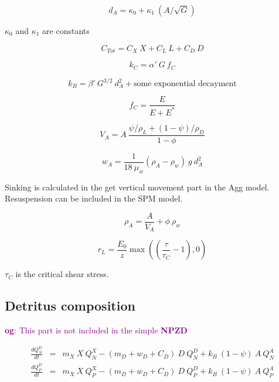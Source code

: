 \documentclass[fleqn]{article}                     %
\newcommand{\comment}[3][darkmagenta]{\textcolor{#1}{\textbf{#2}: #3}}
\begin{document}
\begin{equation}
  d_A = \kappa_0 + \kappa_1\ (A/\sqrt{G})
\end{equation}

$\kappa_0$ and $\kappa_1$ are constants

\begin{equation}
  C_{Tot} = C_X\ X + C_L\ L + C_D\ D
\end{equation}

\begin{equation}
  k_C = \alpha'\ G \ f_C
\end{equation}

\begin{equation}
  k_B = \beta'\ G^{3/2}\ d_A^2 + \textrm{some exponential decayment}
\end{equation}

\begin{equation}
  f_C = \frac{E}{E+E^*}
\end{equation}

\begin{equation}
  V_A = A\  \frac{\psi/ \rho_L + (1-\psi)/ \rho_D}{1-\phi}
\end{equation}

\begin{equation}
  w_A = \frac{1}{18\ \mu_w} (\rho_A-\rho_w)\ g\ d_A^2
\end{equation}

Sinking is calculated in the  get vertical movement part in the Agg model.
Resuspension can be included in the SPM model.

\begin{equation}
  \rho_A = \frac{A}{V_A}+\phi\ \rho_w
\end{equation}

\begin{equation}
r_L = \frac{E_0}{z}\max \left( (\frac{\tau}{\tau_C}-1) ,0 \right)
\end{equation}

$\tau_C$ is the critical shear stress.

\subsection{Detritus composition}
\comment{og}{This part is not included in the simple \textbf{NPZD}}

\begin{eqnarray}
  \frac{dQ^D_N}{dt} &=&  m_X\ X\ Q^X_N - (m_D + w_D + C_D)\ D\ Q^D_N + k_B\ (1-\psi)\ A\ Q^A_N \\
  \frac{dQ^D_P}{dt} &=& m_X\ X\ Q^X_P - (m_D + w_D + C_D)\ D\ Q^D_P + k_B\ (1-\psi)\ A\ Q^A_P
\end{eqnarray}
\end{document}
